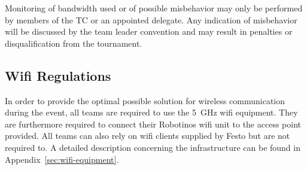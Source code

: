 \documentclass[12pt,twoside]{article}
\newenvironment{rulechange}{}{}
\begin{document}
Monitoring of bandwidth used or of possible misbehavior may only be
performed by members of the TC or an appointed delegate.
Any indication of misbehavior will be discussed by the team leader
convention and may result in penalties or disqualification from the
tournament.



\subsection{Wifi Regulations}
\label{sec:wifi-regulations}
In order to provide the optimal possible solution for wireless
communication during the event, all teams are required to use the
\SI{5}{\giga\hertz} wifi equipment. They are furthermore required to
connect their Robotinos wifi unit to the access point provided. All
teams can also rely on wifi clients supplied by Festo but are not
required to. A detailed description concerning the infrastructure can
be found in Appendix~\ref{sec:wifi-equipment}.

\end{document}
